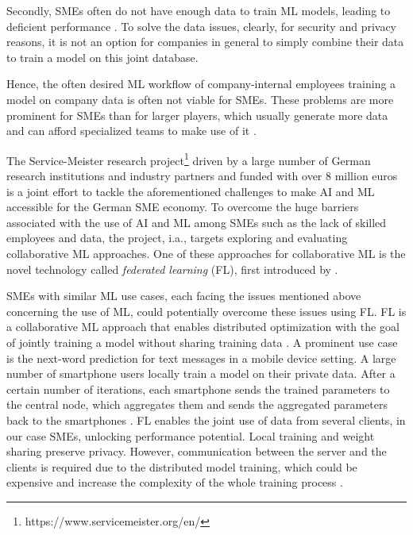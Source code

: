 %
Secondly, SMEs often do not have enough data to train ML models, leading to deficient performance \citep{hbr2021midsizeAI, eco2021kmu}.
To solve the data issues, clearly, for security and privacy reasons, it is not an option for companies in general to simply combine their data to train a model on this joint database.

%
Hence, the often desired ML workflow of company-internal employees training a model on company data is often not viable for SMEs.
%
These problems are more prominent for SMEs than for larger players, which usually generate more data and can afford specialized teams to make use of it \citep{hbr2021midsizeAI, eco2021kmu}.

The Service-Meister research project\footnote{https://www.servicemeister.org/en/} driven by a large number of German research institutions and industry partners and funded with over 8 million euros is a joint effort to tackle the aforementioned challenges to make AI and ML accessible for the German SME economy. To overcome the huge barriers associated with the use of AI and ML among SMEs such as the lack of skilled employees and data, the project, i.a., targets exploring and evaluating collaborative ML approaches. One of these approaches for collaborative ML is the novel technology called \emph{federated learning} (FL), first introduced by \citet{mcmahan2017communication}.

SMEs with similar ML use cases, each facing the issues mentioned above concerning the use of ML, could potentially overcome these issues using FL. FL is a collaborative ML approach that enables distributed optimization with the goal of jointly training a model without sharing training data \citep{mcmahan2017communication}. A prominent use case is the next-word prediction for text messages in a mobile device setting. A large number of smartphone users locally train a model on their private data. After a certain number of iterations, each smartphone sends the trained parameters to the central node, which aggregates them and sends the aggregated parameters back to the smartphones \citep{mcmahan2017communication, bonawitz2017practical, hard2018federated}. FL enables the joint use of data from several clients, in our case SMEs, unlocking performance potential. Local training and weight sharing preserve privacy. However, communication between the server and the clients is required due to the distributed model training, which could be expensive \citep{li2020federated} and increase the complexity of the whole training process \citep{mcmahan2017communication}.

